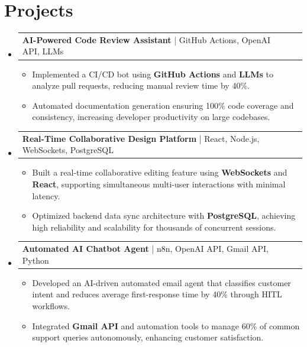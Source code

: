 \documentclass[letterpaper,11pt]{article}
\makeatletter
\newcommand{\resumeItem}[1]{
  \item\footnotesize{
    {#1 \vspace{-2pt}}
  }
}
\newcommand{\resumeProjectHeading}[2]{
    \item
    \begin{tabular*}{1.001\textwidth}{l@{\extracolsep{\fill}}r}
      \small#1 & \textbf{\small #2}\\
    \end{tabular*}\vspace{-7pt}
}
\newcommand{\resumeSubHeadingListStart}{\begin{itemize}[leftmargin=0pt, label={}]}
\newcommand{\resumeSubHeadingListEnd}{\end{itemize}}
\newcommand{\resumeItemListStart}{\begin{itemize}[leftmargin=*]}
\newcommand{\resumeItemListEnd}{\end{itemize}\vspace{-5pt}}
\makeatother
\begin{document}
\section{Projects}
    \vspace{-5pt}
    \resumeSubHeadingListStart
      \resumeProjectHeading
          {\textbf{AI-Powered Code Review Assistant} | GitHub Actions, OpenAI API, LLMs}{}
          \resumeItemListStart
              \resumeItem{Implemented a CI/CD bot using \textbf{GitHub Actions} and \textbf{LLMs} to analyze pull requests, reducing manual review time by 40\%.}
              \resumeItem{Automated documentation generation ensuring 100\% code coverage and consistency, increasing developer productivity on large codebases.}
          \resumeItemListEnd
          \vspace{-12pt}
      \resumeProjectHeading
          {\textbf{Real-Time Collaborative Design Platform} | React, Node.js, WebSockets, PostgreSQL}{}
          \resumeItemListStart
              \resumeItem{Built a real-time collaborative editing feature using \textbf{WebSockets} and \textbf{React}, supporting simultaneous multi-user interactions with minimal latency.}
              \resumeItem{Optimized backend data sync architecture with \textbf{PostgreSQL}, achieving high reliability and scalability for thousands of concurrent sessions.}
          \resumeItemListEnd
          \vspace{-12pt}
      \resumeProjectHeading
          {\textbf{Automated AI Chatbot Agent} | n8n, OpenAI API, Gmail API, Python}{}
          \resumeItemListStart
              \resumeItem{Developed an AI-driven automated email agent that classifies customer intent and reduces average first-response time by 40\% through HITL workflows.}
              \resumeItem{Integrated \textbf{Gmail API} and automation tools to manage 60\% of common support queries autonomously, enhancing customer satisfaction.}
          \resumeItemListEnd 
    \resumeSubHeadingListEnd
\end{document}

